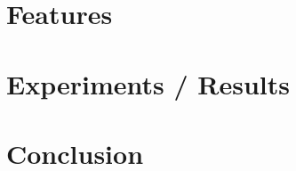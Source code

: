 \documentclass[12pt]{article}
\begin{document}
\section{Features} %
\label{sec:features}


\newpage
\section{Experiments / Results} %
\label{sec:experiments_results}


\newpage
\section{Conclusion} %
\label{sec:conclusion}

\end{document}
